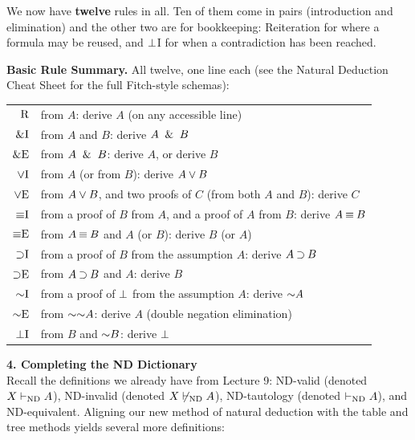 \documentclass[options]{philosophersimprint}
\begin{document}
We now have \textbf{twelve} rules in all. Ten of them come in pairs (introduction and elimination) and the other two are for bookkeeping: Reiteration for where a formula may be reused, and $\bot$I for when a contradiction has been reached.
\begin{framed}
\noindent\textbf{Basic Rule Summary.} All twelve, one line each (see the Natural Deduction Cheat Sheet for the full Fitch-style schemas):\\[-8pt]
\begin{tabular}{@{}rl@{}}
$\text{R}$ & from $A$: derive $A$ (on any accessible line)\\
$\mathord{\mathbin{\&}}\text{I}$ & from $A$ and $B$: derive $A\ \mathbin{\&} \  B$\\
$\mathord{\mathbin{\&}}\text{E}$ & from $A\ \mathbin{\&} \  B$: derive $A$, or derive $B$\\
$\mathord{\mathbin{\vee}}\text{I}$ & from $A$ (or from $B$): derive $A\mathbin{\vee} B$\\
$\mathord{\mathbin{\vee}}\text{E}$ & from $A\mathbin{\vee} B$, and two proofs of $C$ (from both $A$ and $B$): derive $C$\\
$\mathord{\mathbin{\equiv}}\text{I}$ & from a proof of $B$ from $A$, and a proof of $A$ from $B$: derive $A\mathbin{\equiv} B$\\
$\mathord{\mathbin{\equiv}}\text{E}$ & from $A\mathbin{\equiv} B$ and $A$ (or $B$): derive $B$ (or $A$)\\
$\mathord{\mathbin{\supset}}\text{I}$ & from a proof of $B$ from the assumption $A$: derive $A\mathbin{\supset} B$\\
$\mathord{\mathbin{\supset}}\text{E}$ & from $A\mathbin{\supset} B$ and $A$: derive $B$\\
$\mathord{\mathord{\sim}}\text{I}$ & from a proof of $\bot$ from the assumption $A$: derive $\mathord{\sim} A$\\
$\mathord{\mathord{\sim}}\text{E}$ & from $\mathord{\sim}\mathord{\sim} A$: derive $A$ \quad(double negation elimination)\\
$\mathord{\bot}\text{I}$ & from $B$ and $\mathord{\sim} B$: derive $\bot$\\
\end{tabular}
\vspace{-0.75cm}
\end{framed}

\textbf{4. Completing the ND Dictionary}\\
Recall the definitions we already have from Lecture 9: ND-valid (denoted $X \vdash_{\mathrm{ND}} A$), ND-invalid (denoted $X \not\vdash_{\mathrm{ND}} A$), ND-tautology (denoted $\vdash_{\mathrm{ND}} A$), and ND-equivalent. Aligning our new method of natural deduction with the table and tree methods yields several more definitions:
\end{document}
